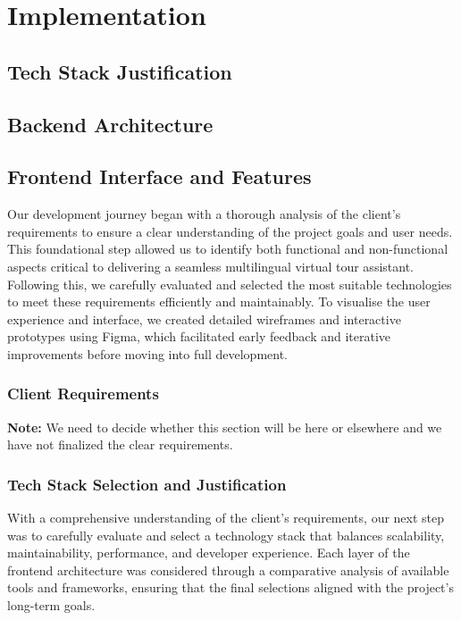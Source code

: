 \chapter{Implementation}
\section{Tech Stack Justification}
\section{Backend Architecture}
\section{Frontend Interface and Features}

Our development journey began with a thorough analysis of the client’s requirements to ensure a clear understanding of the project goals and user needs. This foundational step allowed us to identify both functional and non-functional aspects critical to delivering a seamless multilingual virtual tour assistant. Following this, we carefully evaluated and selected the most suitable technologies to meet these requirements efficiently and maintainably. To visualise the user experience and interface, we created detailed wireframes and interactive prototypes using Figma, which facilitated early feedback and iterative improvements before moving into full development.

\subsection{Client Requirements}

\textbf{Note:} We need to decide whether this section will be here or elsewhere and we have not finalized the clear requirements.

\subsection{Tech Stack Selection and Justification}

With a comprehensive understanding of the client's requirements, our next step was to carefully evaluate and select a technology stack that balances scalability, maintainability, performance, and developer experience. Each layer of the frontend architecture was considered through a comparative analysis of available tools and frameworks, ensuring that the final selections aligned with the project’s long-term goals.

